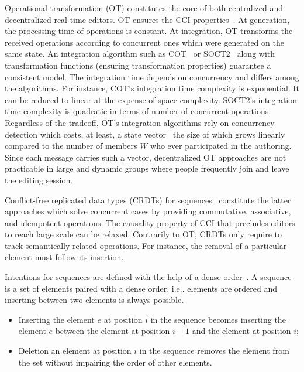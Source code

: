Operational transformation (OT) constitutes the core of both centralized and
decentralized real-time editors. OT ensures the CCI
properties~\cite{sun1998achieving}. At generation, the processing time of
operations is constant. At integration, OT transforms the received operations
according to concurrent ones which were generated on the same state. An
integration algorithm such as COT~\cite{sun2009contextbased} or
SOCT2~\cite{vidot2000copies} along with transformation functions (ensuring
transformation properties) guarantee a consistent model. The integration time
depends on concurrency and differs among the algorithms.  For instance, COT's
integration time complexity is exponential. It can be reduced to linear at the
expense of space complexity. SOCT2's integration time complexity is quadratic in
terms of number of concurrent operations.  Regardless of the tradeoff, OT's
integration algorithms rely on concurrency detection which costs, at least, a
state vector~\cite{charronbost1991concerning} the size of which grows linearly
compared to the number of members $W$ who ever participated in the
authoring. Since each message carries such a vector, decentralized OT approaches
are not practicable in large and dynamic groups where people frequently join and
leave the editing session.

Conflict-free replicated data types (CRDTs) for
sequences~\cite{shapiro2011comprehensive, shapiro2011conflict} constitute the
latter approaches which solve concurrent cases by providing commutative,
associative, and idempotent operations. 
The causality property of CCI that
precludes editors to reach large scale can be relaxed. Contrarily to OT, CRDTs
only require to track semantically related operations. For instance, the removal
of a particular element must follow its insertion. 

Intentions for sequences are defined with the help of a dense
order~\cite{weiss2010logootundo}.
%
A sequence is a set of elements paired with a dense order, i.e., elements are
ordered and inserting between two elements is always possible.
\begin{itemize}
\item Inserting the element $e$ at position $i$ in the sequence becomes
  inserting the element $e$ between the element at position $i-1$ and the
  element at position $i$;
\item Deletion an element at position $i$ in the sequence removes the element
  from the set without impairing the order of other elements.
\end{itemize}

